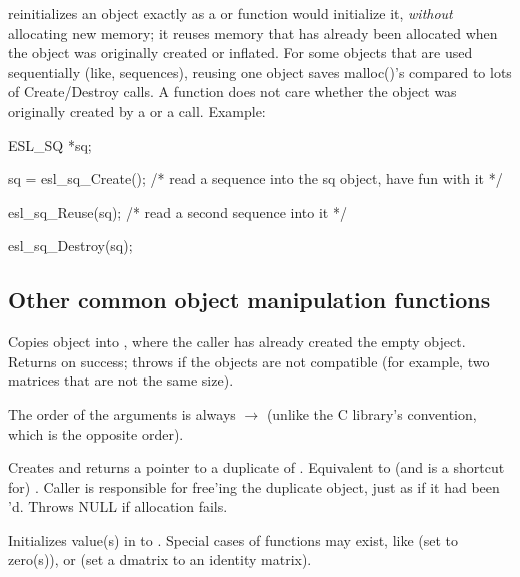 \begin{sreitems}{}
\item [\ccode{Reuse}] 
    reinitializes an object exactly as a
    or  function would initialize it, \emph{without}
   allocating new memory; it reuses memory that has
   already been allocated when the object was originally created or
   inflated. For some objects that are used sequentially (like,
   sequences), reusing one object saves malloc()'s compared to
   lots of Create/Destroy calls. A  function does not
   care whether the object was originally created by a 
   or a  call. Example:

\begin{cchunk}
ESL_SQ *sq;

sq = esl_sq_Create();
  /* read a sequence into the sq object, have fun with it */

esl_sq_Reuse(sq);
  /* read a second sequence into it */

esl_sq_Destroy(sq);
\end{cchunk}

\end{sreitems}

\subsection{Other common object manipulation functions}

\begin{sreitems}{}

\item[\ccode{\_Copy(src, dest)}]
Copies  object into , where the caller has
already created the empty  object. Returns 
on success; throws  if the objects are not
compatible (for example, two matrices that are not the same size).

The order of the arguments is always  $\rightarrow$
 (unlike the C library's  convention, which
is the opposite order).

\item[\ccode{\_Duplicate(obj)}] 

Creates and returns a pointer to a duplicate of .
Equivalent to (and is a shortcut for) . Caller is responsible for free'ing the duplicate
object, just as if it had been 'd. Throws NULL if
allocation fails.

\item[\ccode{\_Set*(obj, value...)}]

Initializes value(s) in  to . Special cases of
 functions may exist, like  (set to
zero(s)), or  (set a dmatrix to an
identity matrix).

\end{sreitems}





